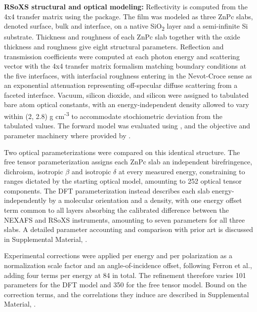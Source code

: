 \textbf{RSoXS structural and optical modeling:} Reflectivity is computed from the 4x4 transfer matrix using the  package.\autocite{ALSRSOXSRefloxide2026a} The film was modeled as three ZnPc slabs, denoted surface, bulk and interface, on a native SiO\textsubscript{2} layer and a semi-infinite Si substrate. Thickness and roughness of each ZnPc slab together with the oxide thickness and roughness give eight structural parameters. Reflection and transmission coefficients were computed at each photon energy and scattering vector with the 4x4 transfer matrix formalism matching boundary conditions at the five interfaces, with interfacial roughness entering in the Nevot-Croce sense as an exponential attenuation representing off-specular diffuse scattering from a faceted interface.\autocite{nevotCaracterisationSurfacesPar1980} Vacuum, silicon dioxide, and silicon were assigned to tabulated bare atom optical constants,\autocite{henkeXRayInteractionsPhotoabsorption1993} with an energy-independent density allowed to vary within (2, 2.8) g cm\textsuperscript{-3} to accommodate stochiometric deviation from the tabulated values. The forward model was evaluated using , and the objective and parameter machinery where provided by .\autocite{nelsonRefnxNeutronXray2019}

Two optical parameterizations were compared on this identical structure. The free tensor parameterization assigns each ZnPc slab an independent birefringence, dichroism, isotropic \(\beta\) and isotropic \(\delta\) at every measured energy, constraining to ranges dictated by the starting optical model, amounting to 252 optical tensor components. The DFT parameterization instead describes each slab energy-independently by a molecular orientation and a density, with one energy offset term common to all layers absorbing the calibrated difference between the NEXAFS and RSoXS instruments, amounting to seven parameters for all three slabs. A detailed parameter accounting and comparison with prior art is discussed in Supplemental Material, .

Experimental corrections were applied per energy and per polarization as a normalization scale factor and an angle-of-incidence offset, following Ferron et al.,\autocite{ferronCompositionDictatesMolecular2023} adding four terms per energy at 84 in total. The refinement therefore varies 101 parameters for the DFT model and 350 for the free tensor model. Bound on the correction terms, and the correlations they induce are described in Supplemental Material, .

